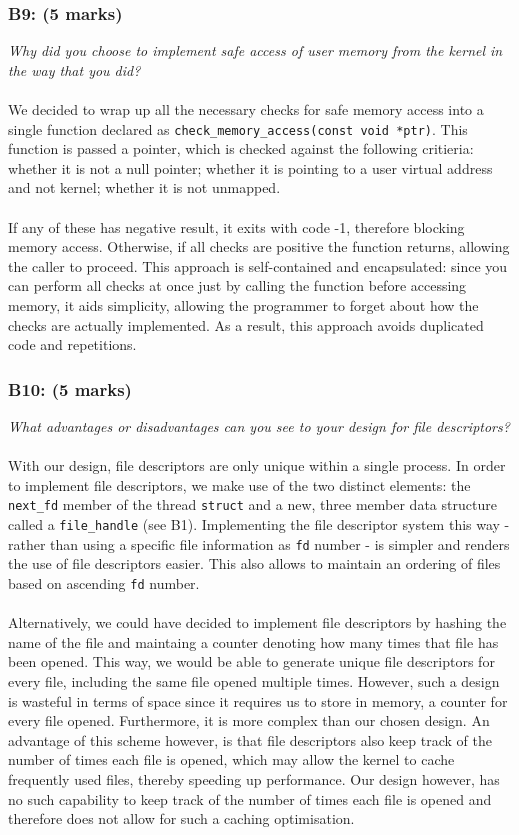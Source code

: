 \documentclass{article}
\begin{document}
\subsubsection*{B9: (5 marks) }
\textit{Why did you choose to implement safe access of user memory from the
kernel in the way that you did?}
\\ \\
We decided to wrap up all the necessary checks for safe memory access into a single function declared as \texttt{check\_memory\_access(const void *ptr)}. This function is passed a pointer, which is checked against the following critieria: whether it is not a null pointer; whether it is pointing to a user virtual address and not kernel; whether it is not unmapped.
\\ \\
If any of these has negative result, it exits with code -1, therefore blocking memory access.
Otherwise, if all checks are positive the function returns, allowing the caller to proceed.
This approach is self-contained and encapsulated: since you can perform all checks at once just by calling the function before accessing memory, it aids simplicity, allowing the programmer to forget about how the checks are actually implemented. As a result, this approach avoids duplicated code and repetitions.

\subsubsection*{B10: (5 marks) }
\textit{What advantages or disadvantages can you see to your design for file
descriptors?}
\\ \\
With our design, file descriptors are only unique within a single process. In order to implement file descriptors,  we make use of the two distinct elements: the \texttt{next\_fd} member of the thread \texttt{struct} and a new, three member data structure called a \texttt{file\_handle} (see B1).
Implementing the file descriptor system this way - rather than using a specific file information as \texttt{fd} number - is simpler and renders the use of file descriptors easier. This also allows to maintain an ordering of files based on ascending \texttt{fd} number.
\\ \\
Alternatively, we could have decided to implement file descriptors by hashing the name of the file and maintaing a counter denoting how many times that file has been opened. This way, we would be able to generate unique file descriptors for every file, including the same file opened multiple times. However, such a design is wasteful in terms of space since it requires us to store in memory, a counter for every file opened. Furthermore, it is more complex than our chosen design. An advantage of this scheme however, is that file descriptors also keep track of the number of times each file is opened, which may allow the kernel to cache frequently used files, thereby speeding up performance. Our design however, has no such capability to keep track of the number of times each file is opened and therefore does not allow for such a caching optimisation.
\end{document}
